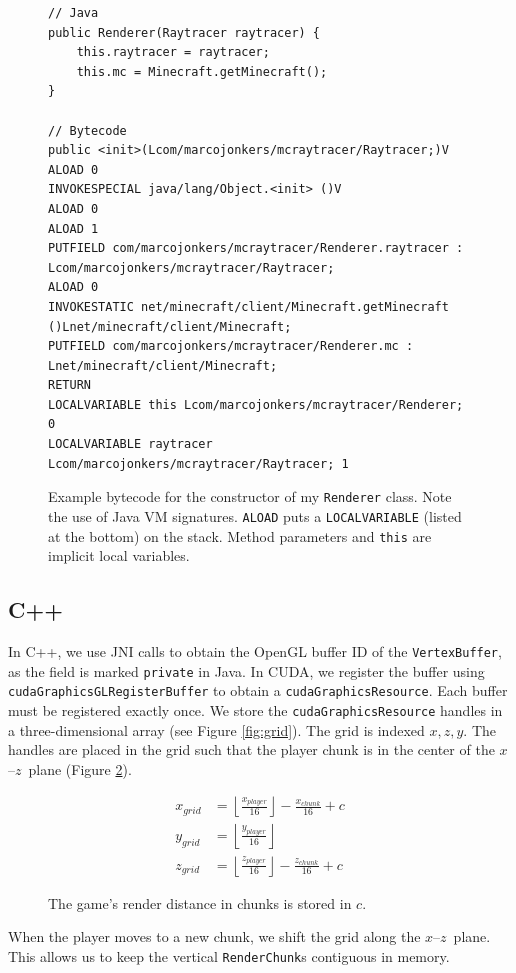 \documentclass[]{article}
\begin{document}
\begin{figure}
\begin{lstlisting}[breaklines]
// Java
public Renderer(Raytracer raytracer) {
    this.raytracer = raytracer;
    this.mc = Minecraft.getMinecraft();
}

// Bytecode
public <init>(Lcom/marcojonkers/mcraytracer/Raytracer;)V
ALOAD 0
INVOKESPECIAL java/lang/Object.<init> ()V
ALOAD 0
ALOAD 1
PUTFIELD com/marcojonkers/mcraytracer/Renderer.raytracer : Lcom/marcojonkers/mcraytracer/Raytracer;
ALOAD 0
INVOKESTATIC net/minecraft/client/Minecraft.getMinecraft ()Lnet/minecraft/client/Minecraft;
PUTFIELD com/marcojonkers/mcraytracer/Renderer.mc : Lnet/minecraft/client/Minecraft;
RETURN
LOCALVARIABLE this Lcom/marcojonkers/mcraytracer/Renderer; 0
LOCALVARIABLE raytracer Lcom/marcojonkers/mcraytracer/Raytracer; 1
\end{lstlisting}
\caption{Example bytecode for the constructor of my \texttt{Renderer} class. Note the use of Java VM signatures. \texttt{ALOAD} puts a \texttt{LOCALVARIABLE} (listed at the bottom) on the stack. Method parameters and \texttt{this} are implicit local variables.}
\label{fig:bytecode}
\end{figure}


\subsection{C++}
In C++, we use JNI calls to obtain the OpenGL buffer ID of the \texttt{VertexBuffer}, as the field is marked \texttt{private} in Java.
In CUDA, we register the buffer using \texttt{cudaGraphicsGLRegisterBuffer} to obtain a \texttt{cudaGraphicsResource}.
Each buffer must be registered exactly once.
We store the \texttt{cudaGraphicsResource} handles in a three-dimensional array (see Figure \ref{fig:grid}).
The grid is indexed $x,z,y$.
The handles are placed in the grid such that the player chunk is in the center of the $x$\nobreakdash--$z$~plane (Figure \ref{eq:grid}).
\begin{figure}
\begin{align}
  x_{grid} &= \left\lfloor\frac{x_{player}}{16}\right\rfloor - \frac{x_{chunk}}{16} + c \nonumber \\
  y_{grid} &= \left\lfloor\frac{y_{player}}{16}\right\rfloor \nonumber \\
  z_{grid} &= \left\lfloor\frac{z_{player}}{16}\right\rfloor - \frac{z_{chunk}}{16} + c
\end{align}
\caption{The game's render distance in chunks is stored in $c$.}
\label{eq:grid}
\end{figure}
When the player moves to a new chunk, we shift the grid along the $x$\nobreakdash--$z$~plane.
This allows us to keep the vertical \texttt{RenderChunk}s contiguous in memory.
\end{document}

